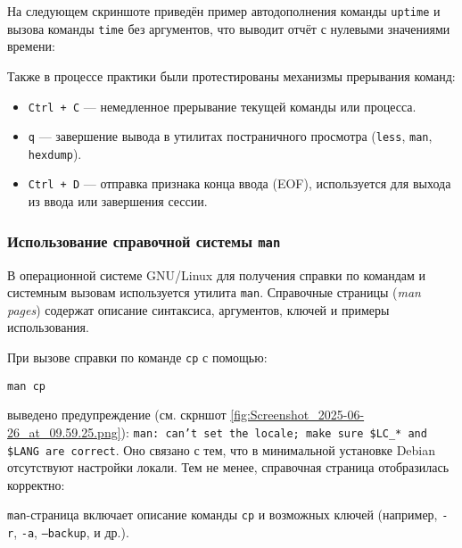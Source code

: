 На следующем скриншоте приведён пример автодополнения команды \texttt{uptime} и вызова команды \texttt{time} без аргументов, что выводит отчёт с нулевыми значениями времени:


Также в процессе практики были протестированы механизмы прерывания команд:

\begin{itemize}
    \item \texttt{Ctrl + C} --- немедленное прерывание текущей команды или процесса.
    \item \texttt{q} --- завершение вывода в утилитах постраничного просмотра (\texttt{less}, \texttt{man}, \texttt{hexdump}).
    \item \texttt{Ctrl + D} --- отправка признака конца ввода (EOF), используется для выхода из ввода или завершения сессии.
\end{itemize}

\subsubsection*{Использование справочной системы \texttt{man}}

В операционной системе GNU/Linux для получения справки по командам и системным вызовам используется утилита \texttt{man}. Справочные страницы (\textit{man pages}) содержат описание синтаксиса, аргументов, ключей и примеры использования.

При вызове справки по команде \texttt{cp} с помощью:

\begin{verbatim}
man cp
\end{verbatim}

 выведено предупреждение (см. скрншот \ref{fig:Screenshot_2025-06-26_at_09.59.25.png}):
\texttt{man: can't set the locale; make sure \$LC\_* and \$LANG are correct}.
Оно связано с тем, что в минимальной установке Debian отсутствуют настройки локали. Тем не менее, справочная страница отобразилась корректно:


\texttt{man}-страница включает описание команды \texttt{cp} и возможных ключей (например, \texttt{-r}, \texttt{-a}, \texttt{--backup}, и др.).


